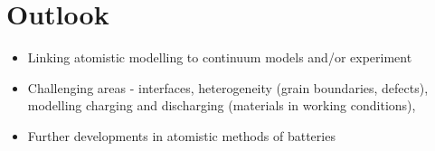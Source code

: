 \documentclass[../main.tex]{subfiles}
\begin{document}
\section{Outlook}
\begin{itemize}
    \item Linking atomistic modelling to continuum models and/or experiment
    \item Challenging areas - interfaces, heterogeneity (grain boundaries, defects), modelling charging and discharging (materials in working conditions), 
    \item Further developments in atomistic methods of batteries
\end{itemize}
\end{document}
